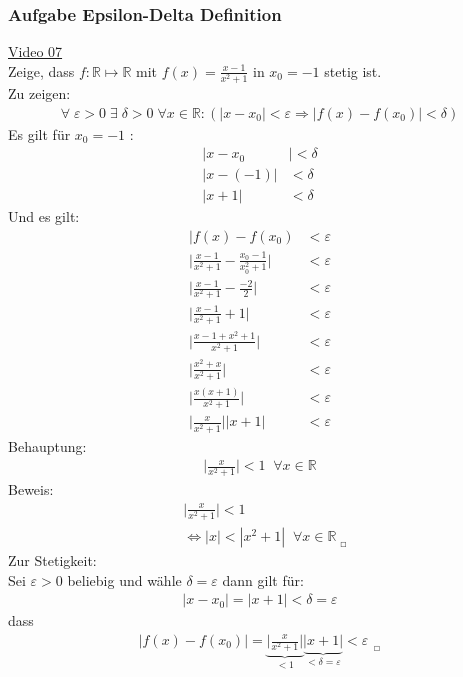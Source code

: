 \subsubsection{Aufgabe Epsilon-Delta Definition}
\href{https://youtu.be/Qnf4afRSK38}{Video 07}\\
Zeige, dass $ f:\mathbb{R}\longmapsto\mathbb{R} $ mit $ f(x)=\frac{x-1}{x^2+1} $ in $ x_0=-1 $ stetig ist.\vspace*{2mm}\\
Zu zeigen:\\
\begin{align*}
\forall\;\varepsilon>0\;\exists\;\delta >0\;\forall x\in \mathbb{R}:(|x-x_0|<\varepsilon\Rightarrow|f(x)-f(x_0)|<\delta)
\end{align*}
Es gilt für $ x_0=-1 $ :\\
\begin{align*}
|x-x_0&|<\delta\\
|x-(-1)|&<\delta\\
|x+1|&<\delta
\end{align*}
\newpage
\noindent
Und es gilt:\\
\begin{align*}
|f(x)-f(x_0)&<\varepsilon\\
\bigg|\frac{x-1}{x^2+1}-\frac{x_0-1}{x_0^2+1}\bigg|&<\varepsilon\\
\bigg|\frac{x-1}{x^2+1}-\frac{-2}{2}\bigg|&<\varepsilon\\
\bigg|\frac{x-1}{x^2+1}+1\bigg|&<\varepsilon\\
\bigg|\frac{x-1+x^2+1}{x^2+1}\bigg|&<\varepsilon\\
\bigg|\frac{x^2+x}{x^2+1}\bigg|&<\varepsilon\\
\bigg|\frac{x(x+1)}{x^2+1}\bigg|&<\varepsilon\\
\bigg|\frac{x}{x^2+1}\bigg|\bigg|x+1\bigg|&<\varepsilon
\end{align*}
Behauptung:\\
\begin{align*}
\bigg|\frac{x}{x^2+1}\bigg|<1\;\;\forall x\in\mathbb{R}
\end{align*}
Beweis:\\
\begin{align*}
&\bigg|\frac{x}{x^2+1}\bigg|<1\\
&\Leftrightarrow |x|<|x^2+1|\;\;\forall x\in\mathbb{R}_{_{\;\;\Square}}
\end{align*}
Zur Stetigkeit:\\
Sei $ \varepsilon>0 $ beliebig und wähle $ \delta=\varepsilon $ dann gilt für:\\
\begin{align*}
|x-x_0|=|x+1|<\delta=\varepsilon
\end{align*}
dass
\begin{align*}
|f(x)-f(x_0)|=\underbrace {\bigg|\frac{x}{x^2+1}\bigg|}_{<1}\underbrace {\bigg|x+1\bigg|}_{<\delta=\varepsilon}<\varepsilon_{\;\;_{\Square}}
\end{align*}

